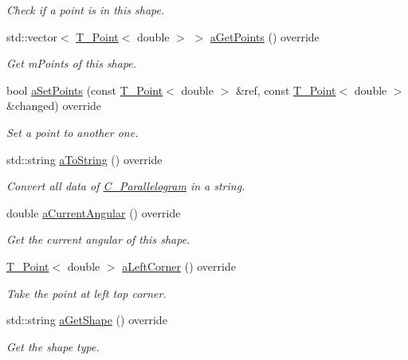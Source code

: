 \begin{DoxyCompactItemize}
\begin{DoxyCompactList}\small\item\em Check if a point is in this shape. \end{DoxyCompactList}\item 
std\+::vector$<$ \hyperlink{classT__Point}{T\+\_\+\+Point}$<$ double $>$ $>$ \hyperlink{classC__Parallelogram_ae75f316315134020e8423feff917828e}{a\+Get\+Points} () override
\begin{DoxyCompactList}\small\item\em Get m\+Points of this shape. \end{DoxyCompactList}\item 
bool \hyperlink{classC__Parallelogram_adfe1c40f2d33955617e3a535c548dfa0}{a\+Set\+Points} (const \hyperlink{classT__Point}{T\+\_\+\+Point}$<$ double $>$ \&ref, const \hyperlink{classT__Point}{T\+\_\+\+Point}$<$ double $>$ \&changed) override
\begin{DoxyCompactList}\small\item\em Set a point to another one. \end{DoxyCompactList}\item 
std\+::string \hyperlink{classC__Parallelogram_add67ef2aba5e14c27e30a958e4843223}{a\+To\+String} () override
\begin{DoxyCompactList}\small\item\em Convert all data of \hyperlink{classC__Parallelogram}{C\+\_\+\+Parallelogram} in a string. \end{DoxyCompactList}\item 
double \hyperlink{classC__Parallelogram_a51959da2b0cf083767f39d8065f395f2}{a\+Current\+Angular} () override
\begin{DoxyCompactList}\small\item\em Get the current angular of this shape. \end{DoxyCompactList}\item 
\hyperlink{classT__Point}{T\+\_\+\+Point}$<$ double $>$ \hyperlink{classC__Parallelogram_a260c557810c63dd97f2dd64bc15b9dc8}{a\+Left\+Corner} () override
\begin{DoxyCompactList}\small\item\em Take the point at left top corner. \end{DoxyCompactList}\item 
std\+::string \hyperlink{classC__Parallelogram_a373fdd3ebdfeffcaa0a72ff7001af8ec}{a\+Get\+Shape} () override
\begin{DoxyCompactList}\small\item\em Get the shape type. \end{DoxyCompactList}\item 

\end{DoxyCompactItemize}
